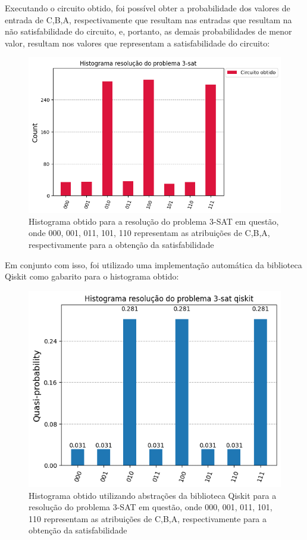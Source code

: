 \documentclass[12pt]{article}
\begin{document}
Executando o circuito obtido, foi possível obter a probabilidade dos valores de entrada de C,B,A, respectivamente que resultam nas entradas que resultam na não satisfabilidade do circuito, e, portanto, as demais probabilidades de menor valor, resultam nos valores que representam a satisfabilidade do circuito:

\begin{figure}[h]
\centering
\includegraphics[width=1\textwidth]{histograma_circuito_obtido.png}
\caption{Histograma obtido para a resolução do problema 3-SAT em questão, onde 000, 001, 011, 101, 110 representam as atribuições de C,B,A, respectivamente para a obtenção da satisfabilidade}
\label{fig:histograma_circuito}
\end{figure}

Em conjunto com isso, foi utilizado uma implementação automática da biblioteca Qiskit como gabarito para o histograma obtido:

\begin{figure}[ht]
\centering
\includegraphics[width=.\textwidth]{gabarito_qiskit.png}
\caption{Histograma obtido utilizando abstrações da biblioteca Qiskit para a resolução do problema 3-SAT em questão, onde 000, 001, 011, 101, 110 representam as atribuições de C,B,A, respectivamente para a obtenção da satisfabilidade}
\label{fig:gabarito_histograma}
\end{figure}
\end{document}
